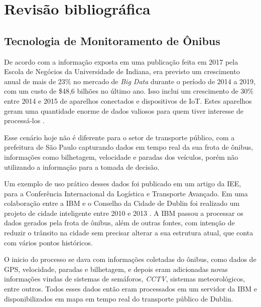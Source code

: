 \chapter{Revisão bibliográfica}
\label{Cap:RevisaoBibliografica}
\newcommand{\WidthAlgumaCoisa}{6.5 cm}



\section{Tecnologia de Monitoramento de Ônibus}

\indent
\par De acordo com a informação exposta em uma publicação feita em 2017 pela Escola de Negócios da Universidade de Indiana, era previsto um crescimento anual de mais de 23\% no mercado de \textit{Big Data} durante o período de 2014 a 2019, com um custo de \$48,6 bilhões no último ano. Isso inclui um crescimento de 30\% entre 2014 e 2015 de aparelhos conectados e dispositivos de IoT. Estes aparelhos geram uma quantidade enorme de dados valiosos para quem tiver interesse de processá-los \cite{Lee2017}.

\par Esse cenário hoje não é diferente para o setor de transporte público, com a prefeitura de São Paulo capturando dados em tempo real da sua frota de ônibus, informações como bilhetagem, velocidade e paradas dos veículos, porém não utilizando a informação para a tomada de decisão.

\par Um exemplo de uso prático desses dados foi publicado em um artigo da IEE, para a Conferência Internacional da Logística e Transporte Avançado. Em uma colaboração entre a IBM e o Conselho da Cidade de Dublin foi realizado um projeto de cidade inteligente entre 2010 e 2013 \cite{BenAyed2015}. A IBM passou a processar os dados gerados pela frota de ônibus, além de outras fontes, com intenção de reduzir o trânsito na cidade sem precisar alterar a sua estrutura atual, que conta com vários pontos históricos.

\par O inicio do processo se dava com informações coletadas do ônibus, como dados de GPS, velocidade, paradas e bilhetagem, e depois eram adicionadas novas informações vindas de sistemas de semáforos, \textit{CCTV}, sistemas meteorológicos, entre outros. Todos esses dados então eram processados em um servidor da IBM e disponibilizados em mapa em tempo real do transporte público de Dublin.

